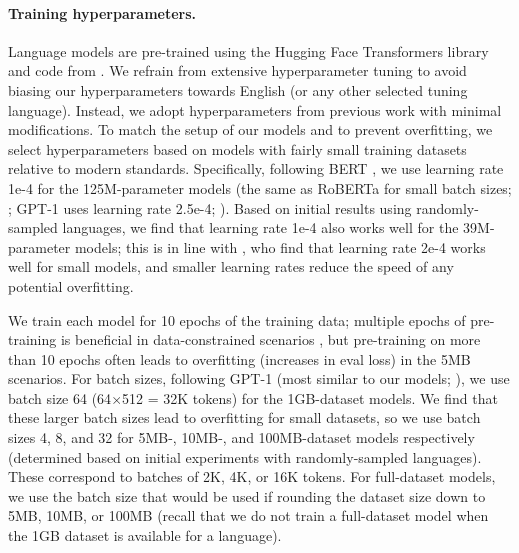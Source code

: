 \documentclass[11pt]{article}
\begin{document}
\paragraph{Training hyperparameters.}
Language models are pre-trained using the Hugging Face Transformers library \citep{wolf-etal-2020-transformers} and code from \citet{chang-bergen-2022-word}.
We refrain from extensive hyperparameter tuning to avoid biasing our hyperparameters towards English (or any other selected tuning language).
Instead, we adopt hyperparameters from previous work with minimal modifications.
To match the setup of our models and to prevent overfitting, we select hyperparameters based on models with fairly small training datasets relative to modern standards.
Specifically, following BERT \citep{devlin-etal-2019-bert}, we use learning rate 1e-4 for the 125M-parameter models (the same as RoBERTa for small batch sizes; \citealp{liu-etal-2019-roberta}; GPT-1 uses learning rate 2.5e-4; \citealp{radford-etal-2018-improving}).
Based on initial results using randomly-sampled languages, we find that learning rate 1e-4 also works well for the 39M-parameter models; this is in line with \citet{chang-etal-2023-multilinguality}, who find that learning rate 2e-4 works well for small models, and smaller learning rates reduce the speed of any potential overfitting.

We train each model for 10 epochs of the training data; multiple epochs of pre-training is beneficial in data-constrained scenarios \citep{muennighoff-etal-2023-scaling}, but pre-training on more than 10 epochs often leads to overfitting (increases in eval loss) in the 5MB scenarios.
For batch sizes, following GPT-1 (most similar to our models; \citealp{radford-etal-2018-improving}), we use batch size 64 (64$\times$512 = 32K tokens) for the 1GB-dataset models.
We find that these larger batch sizes lead to overfitting for small datasets, so we use batch sizes 4, 8, and 32 for \mbox{5MB-,} \mbox{10MB-,} and 100MB-dataset models respectively (determined based on initial experiments with randomly-sampled languages).
These correspond to batches of 2K, 4K, or 16K tokens.
For full-dataset models, we use the batch size that would be used if rounding the dataset size down to 5MB, 10MB, or 100MB (recall that we do not train a full-dataset model when the 1GB dataset is available for a language).
\end{document}
